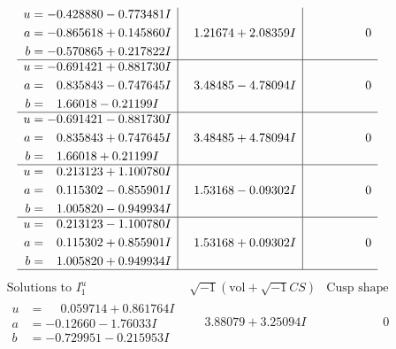 \documentclass[1p]{elsarticle_modified}
\theoremstyle{definition}
\newcommand{\I}{\sqrt{-1}}
\begin{document}
$$\begin{array}{c|c|c}
\begin{aligned}
u &= -0.428880 - 0.773481 I \\
a &= -0.865618 + 0.145860 I \\
b &= -0.570865 + 0.217822 I\end{aligned}
 & \phantom{-}1.21674 + 2.08359 I & \phantom{-0.000000 } 0 \\ \hline\begin{aligned}
u &= -0.691421 + 0.881730 I \\
a &= \phantom{-}0.835843 - 0.747645 I \\
b &= \phantom{-}1.66018 - 0.21199 I\end{aligned}
 & \phantom{-}3.48485 - 4.78094 I & \phantom{-0.000000 } 0 \\ \hline\begin{aligned}
u &= -0.691421 - 0.881730 I \\
a &= \phantom{-}0.835843 + 0.747645 I \\
b &= \phantom{-}1.66018 + 0.21199 I\end{aligned}
 & \phantom{-}3.48485 + 4.78094 I & \phantom{-0.000000 } 0 \\ \hline\begin{aligned}
u &= \phantom{-}0.213123 + 1.100780 I \\
a &= \phantom{-}0.115302 - 0.855901 I \\
b &= \phantom{-}1.005820 - 0.949934 I\end{aligned}
 & \phantom{-}1.53168 - 0.09302 I & \phantom{-0.000000 } 0 \\ \hline\begin{aligned}
u &= \phantom{-}0.213123 - 1.100780 I \\
a &= \phantom{-}0.115302 + 0.855901 I \\
b &= \phantom{-}1.005820 + 0.949934 I\end{aligned}
 & \phantom{-}1.53168 + 0.09302 I & \phantom{-0.000000 } 0\\
 \hline 
 \end{array}$$\newpage$$\begin{array}{c|c|c}  
\text{Solutions to }I^u_{1}& \I (\text{vol} + \sqrt{-1}CS) & \text{Cusp shape}\\
 \hline 
\begin{aligned}
u &= \phantom{-}0.059714 + 0.861764 I \\
a &= -0.12660 - 1.76033 I \\
b &= -0.729951 - 0.215953 I\end{aligned}
 & \phantom{-}3.88079 + 3.25094 I & \phantom{-0.000000 } 0 \\ \hline\begin{aligned}

\end{aligned}
\end{array}$$
\end{document}
